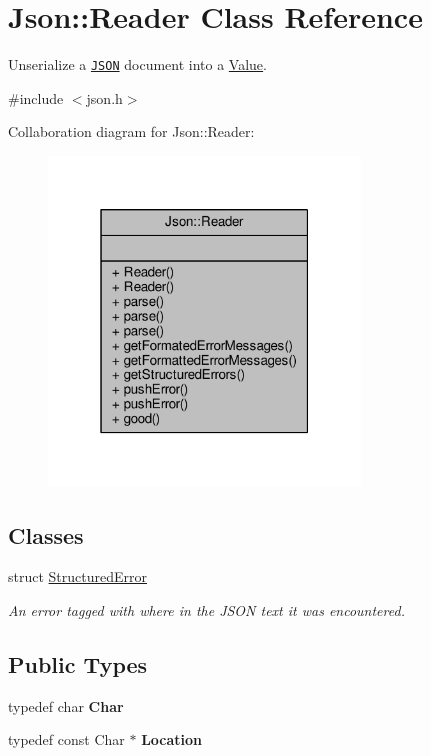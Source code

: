 \hypertarget{classJson_1_1Reader}{}\section{Json\+:\+:Reader Class Reference}
\label{classJson_1_1Reader}


Unserialize a \href{http://www.json.org}{\tt J\+S\+ON} document into a \hyperlink{classJson_1_1Value}{Value}.  




{\ttfamily \#include $<$json.\+h$>$}



Collaboration diagram for Json\+:\+:Reader\+:
\nopagebreak
\begin{figure}[H]
\begin{center}
\leavevmode
\includegraphics[width=235pt]{d3/d59/classJson_1_1Reader__coll__graph}
\end{center}
\end{figure}
\subsection*{Classes}
\begin{DoxyCompactItemize}
\item 
struct \hyperlink{structJson_1_1Reader_1_1StructuredError}{Structured\+Error}
\begin{DoxyCompactList}\small\item\em An error tagged with where in the J\+S\+ON text it was encountered. \end{DoxyCompactList}\end{DoxyCompactItemize}
\subsection*{Public Types}
\begin{DoxyCompactItemize}
\item 
typedef char {\bfseries Char}\hypertarget{classJson_1_1Reader_a3eec9118f3e9a672ba8348c3a79d0f45}{}\label{classJson_1_1Reader_a3eec9118f3e9a672ba8348c3a79d0f45}

\item 
typedef const Char $\ast$ {\bfseries Location}\hypertarget{classJson_1_1Reader_a46795b5b272bf79a7730e406cb96375a}{}\label{classJson_1_1Reader_a46795b5b272bf79a7730e406cb96375a}

\end{DoxyCompactItemize}
